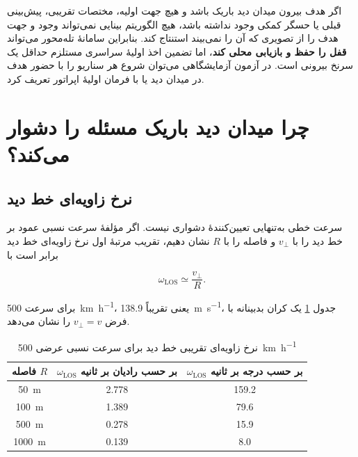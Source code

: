 \documentclass[12pt,a4paper]{article}
\begin{document}
\begin{warningbox}
اگر هدف بیرون میدان دید باریک باشد و هیچ جهت اولیه، مختصات تقریبی، پیش‌بینی قبلی یا حسگر کمکی وجود نداشته باشد، هیچ الگوریتم بینایی نمی‌تواند وجود و جهت هدف را از تصویری که آن را نمی‌بیند استنتاج کند. بنابراین سامانهٔ تله‌محور می‌تواند \textbf{قفل را حفظ و بازیابی محلی کند}، اما تضمین اخذ اولیهٔ سراسری مستلزم حداقل یک سرنخ بیرونی است. در آزمون آزمایشگاهی می‌توان شروع هر سناریو را با حضور هدف در میدان دید یا با فرمان اولیهٔ اپراتور تعریف کرد.
\end{warningbox}

\section{چرا میدان دید باریک مسئله را دشوار می‌کند؟}

\subsection{نرخ زاویه‌ای خط دید}

سرعت خطی به‌تنهایی تعیین‌کنندهٔ دشواری نیست. اگر مؤلفهٔ سرعت نسبی عمود بر خط دید را با $v_{\perp}$ و فاصله را با $R$ نشان دهیم، تقریب مرتبهٔ اول نرخ زاویه‌ای خط دید برابر است با

\begin{equation}
\omega_{\mathrm{LOS}} \simeq \frac{v_{\perp}}{R}.
\label{eq:losrate}
\end{equation}

برای سرعت \SI{500}{\kilo\meter\per\hour}، یعنی تقریباً \SI{138.9}{\meter\per\second}، جدول \ref{tab:losrate} یک کران بدبینانه با فرض $v_{\perp}=v$ را نشان می‌دهد.

\begin{table}[H]
\centering
\caption{نرخ زاویه‌ای تقریبی خط دید برای سرعت نسبی عرضی \SI{500}{\kilo\meter\per\hour}}
\label{tab:losrate}
\begin{tabular}{ccc}
\toprule
فاصله $R$ & $\omega_{\mathrm{LOS}}$ بر حسب رادیان بر ثانیه & $\omega_{\mathrm{LOS}}$ بر حسب درجه بر ثانیه \\
\midrule
\SI{50}{\meter} & 2.778 & 159.2 \\
\SI{100}{\meter} & 1.389 & 79.6 \\
\SI{500}{\meter} & 0.278 & 15.9 \\
\SI{1000}{\meter} & 0.139 & 8.0 \\
\bottomrule
\end{tabular}
\end{table}
\end{document}
